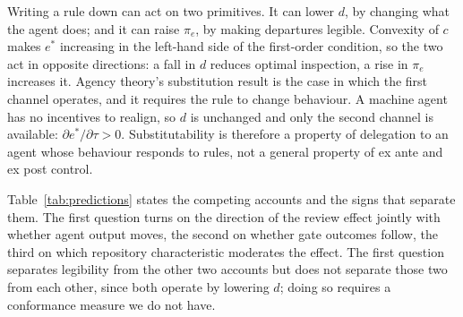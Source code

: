 \documentclass[mnsc]{informs4}
\begin{document}
Writing a rule down can act on two primitives. It can lower $d$, by changing what
the agent does; and it can raise $\pi_e$, by making departures legible. Convexity
of $c$ makes $e^{*}$ increasing in the left-hand side of the first-order condition,
so the two act in opposite directions: a fall in $d$ reduces optimal inspection, a
rise in $\pi_e$ increases it. Agency theory's substitution result is the case in
which the first channel operates, and it requires the rule to change behaviour. A
machine agent has no incentives to realign, so $d$ is unchanged and only the second
channel is available: $\partial e^{*}/\partial \tau > 0$. Substitutability is
therefore a property of delegation to an agent whose behaviour responds to rules,
not a general property of ex ante and ex post control.

Table~\ref{tab:predictions} states the competing accounts and the signs that
separate them. The first question turns on the direction of the review
effect jointly with whether agent output moves, the second on whether gate outcomes
follow, the third on which repository characteristic moderates the effect. The
first question separates legibility from the other two accounts but does not
separate those two from each other, since both operate by lowering $d$; doing so
requires a conformance measure we do not have.
\end{document}
